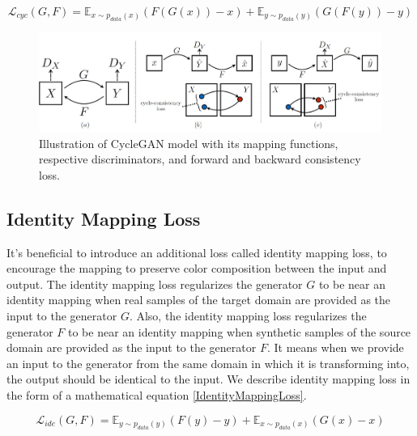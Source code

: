 \begin{equation}\label{CycleConsistencyLossEquation}
    \mathcal{L}_{cyc}(G, F) = \mathbb{E}_{x \sim p_{data}(x)} (F(G(x)) - x) + \mathbb{E}_{y \sim p_{data}(y)} (G(F(y)) - y)
\end{equation}

\begin{figure}[H]
	    \begin{center} \includegraphics[scale=0.5]{images/Methodology/CycleGAN.jpg}
	    \caption[Illustration of \ac{CycleGAN} model with its mapping functions, respective discriminators, and forward and backward consistency loss.]{Illustration of \ac{CycleGAN} model with its mapping functions, respective discriminators, and forward and backward consistency loss\cite{zhu2020unpaired}.}
	    \label{fig:CycleGAN}
	    \end{center}
\end{figure}

\subsection{Identity Mapping Loss}

It's beneficial to introduce an additional loss called identity mapping loss, to encourage the mapping to preserve color composition between the input and output\cite{taigman2016unsupervised}. The identity mapping loss regularizes the generator $G$ to be near an identity mapping when real samples of the target domain are provided as the input to the generator $G$. Also, the identity mapping loss regularizes the generator $F$ to be near an identity mapping when synthetic samples of the source domain are provided as the input to the generator $F$. It means when we provide an input to the generator from the same domain in which it is transforming into, the output should be identical to the input. We describe identity mapping loss in the form of a mathematical equation \ref{IdentityMappingLoss}.

\begin{equation}\label{IdentityMappingLoss}
    \mathcal{L}_{ide}(G, F) = \mathbb{E}_{y \sim p_{data}(y)}(F(y) - y) + \mathbb{E}_{x \sim p_{data}(x)}(G(x) - x)
    \end{equation}

